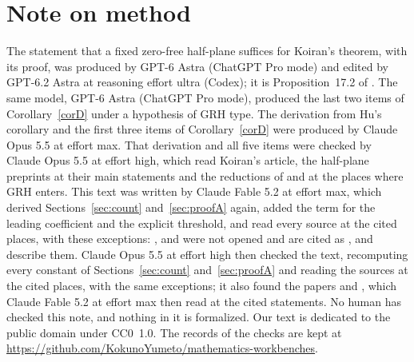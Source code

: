 \documentclass[11pt]{amsart}
\newcommand{\recordurl}{https://github.com/KokunoYumeto/mathematics-workbenches}
\theoremstyle{definition}
\theoremstyle{remark}
\begin{document}
\section*{Note on method}
The statement that a fixed zero-free half-plane suffices for Koiran's theorem, with its proof, was produced by GPT-6 Astra (ChatGPT Pro mode) and edited by GPT-6.2 Astra at reasoning effort ultra (Codex); it is Proposition~17.2 of \cite{N}. The same model, GPT-6 Astra (ChatGPT Pro mode), produced the last two items of Corollary~\ref{corD} under a hypothesis of GRH type. The derivation from Hu's corollary and the first three items of Corollary~\ref{corD} were produced by Claude Opus 5.5 at effort max. That derivation and all five items were checked by Claude Opus 5.5 at effort high, which read Koiran's article, the half-plane preprints at their main statements and the reductions of \cite{A24} and \cite{PR25} at the places where GRH enters. This text was written by Claude Fable 5.2 at effort max, which derived Sections~\ref{sec:count} and~\ref{sec:proofA} again, added the term for the leading coefficient and the explicit threshold, and read every source at the cited places, with these exceptions: \cite{LO}, \cite{BHZ} and \cite{Lac} were not opened and are cited as \cite{FSW}, \cite{PR25} and \cite{BS} describe them. Claude Opus 5.5 at effort high then checked the text, recomputing every constant of Sections~\ref{sec:count} and~\ref{sec:proofA} and reading the sources at the cited places, with the same exceptions; it also found the papers \cite{FSW} and \cite{BS}, which Claude Fable 5.2 at effort max then read at the cited statements. No human has checked this note, and nothing in it is formalized. Our text is dedicated to the public domain under CC0~1.0. The records of the checks are kept at \url{\recordurl}.
\end{document}
